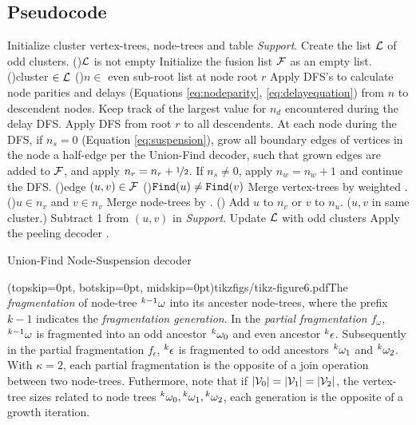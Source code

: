 \subsection{Pseudocode}\label{sec:pseudocode}
\begin{algorithm}[htb]
  \BlankLine
  \BlankLine
  Initialize cluster vertex-trees, node-trees and table \emph{Support}.\;\label{algo:B1a}
  Create the list $\mathcal{L}$ of odd clusters.\;
  \While(){$\mathcal{L}$ is not empty}{
    Initialize the fusion list $\mathcal{F}$ as an empty list.\;\label{algo:B1b}
    \For(){cluster $\in\mathcal{L}$ \label{algo:B2a}}{
      \For(){$n \in$ even sub-root list at node root $r$}{
        Apply DFS's to calculate node parities and delays (Equations \eqref{eq:nodeparity}, \eqref{eq:delayequation}) from $n$ to descendent nodes. Keep track of the largest value for $n_d$ encountered during the delay DFS.\;\label{algo:pdc}
      }
      Apply DFS from root $r$ to all descendents. At each node during the DFS, if $n_s=0$ (Equation \eqref{eq:suspension}), grow all boundary edges of vertices in the node a half-edge per the Union-Find decoder, such that grown edges are added to $\mathcal{F}$, and apply $n_r=n_r+\nicefrac{1}{2}$. If $n_s\neq0$, apply $n_w=n_w+1$ and continue the DFS.\;\label{algo:grow}
    }
    \For(){edge $(u,v) \in \mathcal{F}$\label{algo:B3a}}{
      \eIf(){$\texttt{Find}(u)\neq\texttt{Find}(v)$}{
        Merge vertex-trees by weighted .\;
        \eIf(){$u \in n_v$ and $v \in n_v$\label{algo:joina}}{
          Merge node-trees by .\;
        }(){
          Add $u$ to $n_v$ or $v$ to $n_u$.\;\label{algo:joinb}
        }
      }($u,v$ in same cluster.\label{algo:dfa}){
        Subtract 1 from $(u,v)$ in \emph{Support}.\;\label{algo:dfb}
      }
    }
    Update $\mathcal{L}$ with odd clusters\; \label{algo:B3b}
  }
  Apply the peeling decoder \cite{delfosse2017linear}.\label{algo:B4a}
  \caption{Union-Find Node-Suspension decoder}\label{algo:ufbb}
\end{algorithm}

\Figure[hbt](topskip=0pt, botskip=0pt, midskip=0pt){tikzfigs/tikz-figure6.pdf}{The \emph{fragmentation} of node-tree ${}^{k-1}\omega$ into its ancester node-trees, where the prefix $k-1$ indicates the \emph{fragmentation generation}. In the \emph{partial fragmentation} $f_\omega$, ${}^{k-1}\omega$ is fragmented into an odd ancestor ${}^{k}\omega_0$ and even ancestor ${}^{k}\epsilon$. Subsequently in the partial fragmentation $f_\epsilon$, ${}^{k}\epsilon$ is fragmented to odd ancestors ${}^{k}\omega_{1}$ and ${}^{k}\omega_{2}$. With $\kappa=2$, each partial fragmentation is the opposite of a join operation between two node-trees. Futhermore, note that if $\lvert\mathcal{V}_0\rvert = \lvert\mathcal{V}_1\rvert = \lvert\mathcal{V}_2\rvert$, the vertex-tree sizes related to node trees ${}^{k}\omega_0, {}^{k}\omega_1, {}^{k}\omega_2$, each generation is the opposite of a growth iteration. \label{fig6}}

